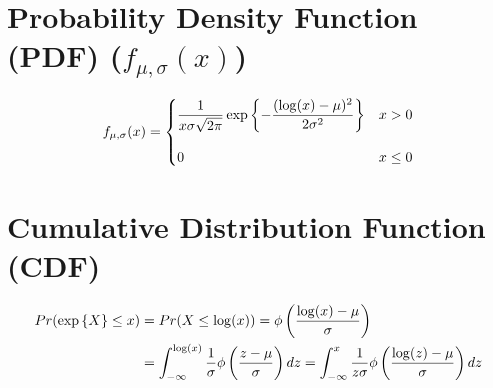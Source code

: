 \section{Probability Density Function (PDF) ($f_{\mu,\sigma}(x)$) \cite{ism-1}} \label{Lognormal Distribution: PDF}

\[
    f_{\mu,\sigma}(x)
    = \begin{dcases}
        \dfrac{1}{x\sigma\sqrt{2\pi}}
        \exp\dCurlyBrac{-\dfrac{(\log(x) - \mu)^2}{2\sigma^2}} & x > 0 \\[2ex]
        
        0 & x \leq 0
    \end{dcases}
\]


\section{Cumulative Distribution Function (CDF) \cite{ism-1}} \label{Lognormal Distribution: CDF}

\[
\begin{aligned}
    Pr(\exp\left\{X\right\} \leq x) 
    &= Pr(X \leq \log(x))
    = \phi\left(\dfrac{\log(x) - \mu}{\sigma}\right) \\
    &= \displaystyle\int_{-\infty}^{\log(x)} \dfrac{1}{\sigma}
        \phi\left(\dfrac{z - \mu}{\sigma}\right) dz
    = \displaystyle\int_{-\infty}^{x} \dfrac{1}{z\sigma}
        \phi\left(\dfrac{\log(z) - \mu}{\sigma}\right) dz \\
\end{aligned}
\]


